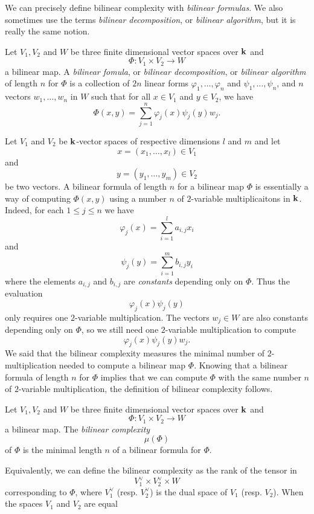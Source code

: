 We can precisely define bilinear complexity with \emph{bilinear formulas}. We
also sometimes use the terms \emph{bilinear decomposition}, or \emph{bilinear
algorithm}, but it is really the same notion.
\begin{defi}
  Let $V_1, V_2$ and $W$ be three finite dimensional vector spaces over $\mathbf{k}$ and 
  \[
    \Phi:V_1\times V_2\to W
  \]
  a bilinear map. A \emph{bilinear fomula}, or \emph{bilinear decomposition}, or
  \emph{bilinear algorithm} of length $n$ for $\Phi$ is a
  collection of $2n$ linear forms $\varphi_1, \dots, \varphi_n$ and $\psi_1,
  \dots, \psi_n$, and $n$ vectors $w_1, \dots, w_n$ in $W$ such that for all
  $x\in V_1$ and $y\in V_2$, we have
  \[
    \Phi(x, y) = \sum_{j=1}^n \varphi_j(x)\psi_j(y)w_j.
  \]
\end{defi}
Let $V_1$ and $V_2$ be $\mathbf{k}$-vector spaces of respective dimensions $l$ and $m$
and let
\[
  x = (x_1, \dots, x_l)\in V_1
\]
and
\[
  y = (y_1, \dots, y_m)\in V_2
\]
be two vectors.
A bilinear formula of length $n$ for a bilinear map $\Phi$ is essentially a way
of computing $\Phi(x, y)$ using a number $n$ of $2$-variable multiplicaitons in $\mathbf{k}$.
Indeed, for each $1\leq j \leq n$ we have
\[
  \varphi_j(x) = \sum_{i=1}^l a_{i, j}x_i
\]
and
\[
  \psi_j(y) = \sum_{i=1}^m b_{i, j}y_i
\]
where the elements $a_{i, j}$ and $b_{i, j}$ are \emph{constants} depending only
on $\Phi$. Thus the evaluation
\[
  \varphi_j(x)\psi_j(y)
\]
only requires one $2$-variable multiplication. The vectors $w_j\in W$ are also
constants depending only on $\Phi$, so we still need one $2$-variable
multiplication to compute 
\[
  \varphi_j(x)\psi_j(y)w_j.
\]
We said that the bilinear complexity measures the minimal number of
$2$-multiplication needed to compute a bilinear map $\Phi$. Knowing that a
bilinear formula of length $n$ for $\Phi$ implies that we can compute $\Phi$
with the same number $n$ of $2$-variable multiplication, the definition of
bilinear complexity follows.
\begin{defi}
  Let $V_1, V_2$ and $W$ be three finite dimensional vector spaces over $\mathbf{k}$ and 
  \[
    \Phi:V_1\times V_2\to W
  \]
  a bilinear map. The \emph{bilinear complexity} 
  \[
    \mu(\Phi)
  \]
  of $\Phi$ is the minimal length $n$ of a bilinear formula for $\Phi$.
\end{defi}
Equivalently, we can define the bilinear complexity as the rank of the tensor in 
\[
  V_1^\vee \times V_2^\vee \times W
\]
corresponding to $\Phi$, where $V_1^\vee$ (resp. $V_2^\vee$) is the dual space
of $V_1$ (resp. $V_2$). When the spaces $V_1$ and $V_2$ are equal
